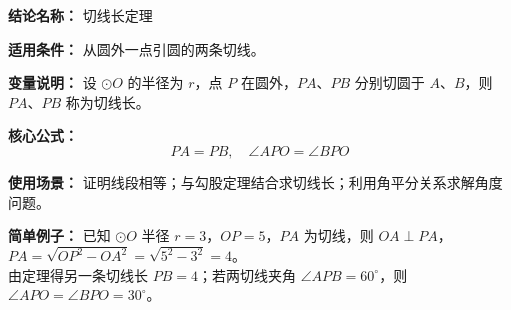 \textbf{结论名称：} 切线长定理

\textbf{适用条件：} 从圆外一点引圆的两条切线。

\textbf{变量说明：} 设 $\odot O$ 的半径为 $r$，点 $P$ 在圆外，$PA$、$PB$ 分别切圆于 $A$、$B$，则 $PA$、$PB$ 称为切线长。

\textbf{核心公式：} \[ \boxed{PA = PB,\quad \angle APO = \angle BPO} \]

\textbf{使用场景：} 证明线段相等；与勾股定理结合求切线长；利用角平分关系求解角度问题。

\textbf{简单例子：} 已知 $\odot O$ 半径 $r=3$，$OP=5$，$PA$ 为切线，则 $OA\perp PA$，\\
$PA=\sqrt{OP^{2}-OA^{2}}=\sqrt{5^{2}-3^{2}}=4$。\\
由定理得另一条切线长 $PB=4$；若两切线夹角 $\angle APB=60^{\circ}$，则 $\angle APO=\angle BPO=30^{\circ}$。